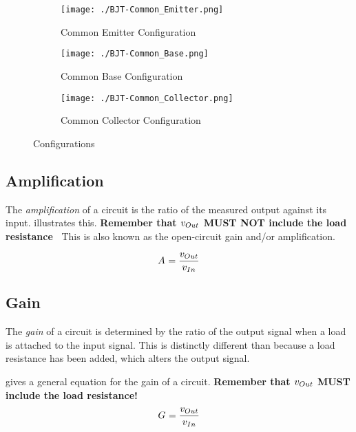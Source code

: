\begin{figure}[h!tbp]
  \centering
  \begin{subfigure}{0.30\linewidth}
    \centering
    \texttt{[image: ./BJT-Common\_Emitter.png]}
    \caption{Common Emitter Configuration\\\parencite[p.~424]{sedraTextbook7}}
    \label{fig:BJT-Common_Emitter}
  \end{subfigure}
  \begin{subfigure}{0.30\linewidth}
    \centering
    \texttt{[image: ./BJT-Common\_Base.png]}
    \caption{Common Base Configuration\\\parencite[p.~424]{sedraTextbook7}}
    \label{fig:BJT-Common_Base}
  \end{subfigure}
  \begin{subfigure}{0.30\linewidth}
    \centering
    \texttt{[image: ./BJT-Common\_Collector.png]}
    \caption{Common Collector Configuration\\\parencite[p.~424]{sedraTextbook7}}
    \label{fig:BJT-Common_Collector}
  \end{subfigure}
  \caption{ Configurations}
  \label{fig:BJT_Configurations}
\end{figure}

\subsection{Amplification}\label{subsec:Amplification}
The \emph{amplification} of a circuit is the ratio of the measured output against its input.
 illustrates this.
\textbf{Remember that $\ACVoltage{\Out}$ MUST NOT include the load resistance~}
This is also known as the open-circuit gain and/or amplification.

\begin{equation}\label{eq:Amplification}
  \Amp{} = \frac{\ACVoltage{\Out}}{\ACVoltage{\In}}
\end{equation}

\subsection{Gain}\label{subsec:Gain}
The \emph{gain} of a circuit is determined by the ratio of the output signal when a load is attached to the input signal.
This is distinctly different than  because a load resistance has been added, which alters the output signal.

 gives a general equation for the gain of a circuit.
\textbf{Remember that $\ACVoltage{\Out}$ MUST include the load resistance!}
\begin{equation}\label{eq:Gain}
  \Gain{} = \frac{\ACVoltage{\Out}}{\ACVoltage{\In}}
\end{equation}


